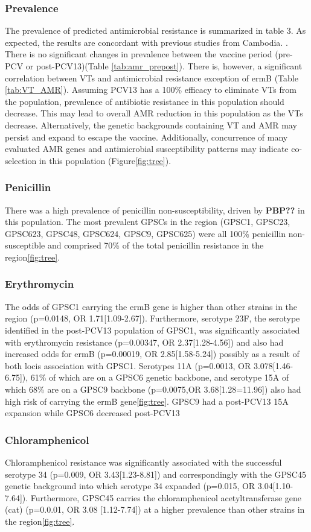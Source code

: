 \documentclass{article}
\begin{document}
\subsubsection{Prevalence}
The prevalence of predicted antimicrobial resistance is summarized in table 3. As expected, the results are concordant with previous studies from Cambodia. \cite{turnerPneumococcalInfectionChildren2015}. There is no significant changes in prevalence between the vaccine period (pre-PCV or post-PCV13)(Table \ref{tab:amr_prepost}). There is, however, a significant correlation between VTs and antimicrobial resistance exception of ermB (Table \ref{tab:VT_AMR}). Assuming PCV13 has a 100\% efficacy to eliminate VTs from the population, prevalence of antibiotic resistance in this population should decrease. This may lead to overall AMR reduction in this population as the VTs decrease. Alternatively, the genetic backgrounds containing VT and AMR may persist and expand to escape the vaccine. Additionally, concurrence of many evaluated AMR genes and antimicrobial susceptibility patterns may indicate co-selection in this population (Figure\ref{fig:tree}). 
\subsubsection{Penicillin}
There was a high prevalence of penicillin non-susceptibility, driven by \textbf{PBP??} in this population. The most prevalent GPSCs in the region (GPSC1, GPSC23, GPSC623, GPSC48, GPSC624, GPSC9, GPSC625) were all 100\% penicillin non-susceptible and comprised 70\% of the total penicillin resistance in the region\ref{fig:tree}. 
\subsubsection{Erythromycin}
The odds of GPSC1 carrying the ermB gene is higher than other strains in the region (p=0.0148, OR 1.71[1.09-2.67]). Furthermore, serotype 23F, the serotype identified in the post-PCV13 population of GPSC1, was significantly associated with erythromycin resistance (p=0.00347, OR 2.37[1.28-4.56]) and also had increased odds for ermB (p=0.00019, OR 2.85[1.58-5.24]) possibly as a result of both locis association with GPSC1. Serotypes 11A (p=0.0013, OR 3.078[1.46-6.75]), 61\% of which are on a GPSC6 genetic backbone,  and serotype 15A of which 68\% are on a GPSC9 backbone (p=0.0075,OR 3.68[1.28=11.96]) also had high risk of carrying the ermB gene\ref{fig:tree}. GPSC9 had a post-PCV13 15A expansion while GPSC6 decreased post-PCV13
\subsubsection{Chloramphenicol}
Chloramphenicol resistance was significantly associated with the successful serotype 34 (p=0.009, OR 3.43[1.23-8.81]) and correspondingly with the GPSC45 genetic background into which serotype 34 expanded (p=0.015, OR 3.04[1.10-7.64]). Furthermore, GPSC45 carries the chloramphenicol acetyltransferase gene (cat) (p=0.0.01, OR 3.08 [1.12-7.74]) at a higher prevalence than other strains in the region\ref{fig:tree}. 
\end{document}
